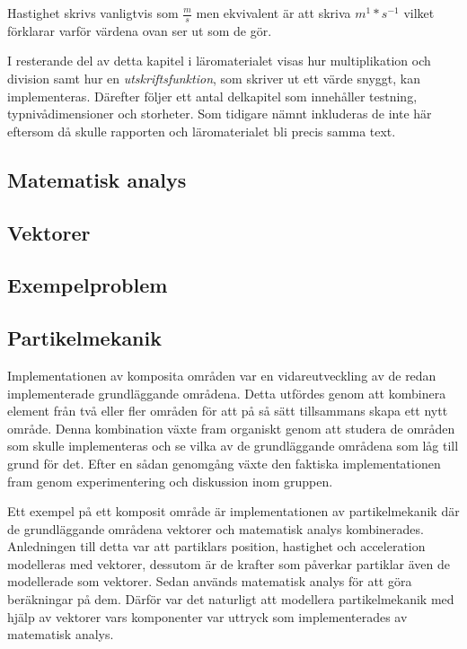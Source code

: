 Hastighet skrivs vanligtvis som $\frac{m}{s}$ men ekvivalent är att skriva $m^1*s^{-1}$ vilket förklarar varför värdena ovan ser ut som de gör.

I resterande del av detta kapitel i läromaterialet visas hur multiplikation och division samt hur en \textit{utskriftsfunktion}, som skriver ut ett värde snyggt, kan implementeras. Därefter följer ett antal delkapitel som innehåller testning, typnivådimensioner och storheter. Som tidigare nämnt inkluderas de inte här eftersom då skulle rapporten och läromaterialet bli precis samma text.

\subsection{Matematisk analys}

\subsection{Vektorer}

\subsection{Exempelproblem}

\subsection{Partikelmekanik}

Implementationen av komposita områden var en vidareutveckling av de redan
implementerade grundläggande områdena. Detta utfördes genom att kombinera
element från två eller fler områden för att på så sätt tillsammans skapa ett
nytt område. Denna kombination växte fram organiskt genom att studera de områden
som skulle implementeras och se vilka av de grundläggande områdena som
låg till grund för det. Efter en sådan genomgång växte den faktiska
implementationen fram genom experimentering och diskussion inom gruppen.

Ett exempel på ett komposit område är implementationen av partikelmekanik
där de grundläggande områdena vektorer och matematisk analys
kombinerades. Anledningen till detta var att partiklars position, hastighet och
acceleration modelleras med vektorer, dessutom är de krafter som påverkar
partiklar även de modellerade som vektorer. Sedan används matematisk analys för att
göra beräkningar på dem. Därför var det naturligt att modellera partikelmekanik
med hjälp av vektorer vars komponenter var uttryck som
implementerades av matematisk analys.

